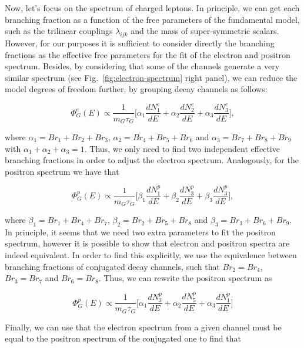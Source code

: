 \documentclass[a4paper,11pt]{article}
\begin{document}
Now, let's focus on the spectrum of charged leptons. In principle, we can get each branching fraction as a function of the free parameters of the fundamental model, such as the trilinear couplings $\lambda_{ijk}$ and the mass of super-symmetric scalars. However, for our purposes it is sufficient to consider directly the branching fractions as the effective free parameters for the fit of the electron and positron spectrum. Besides, by considering that some of the channels generate a very similar spectrum (see Fig.~\ref{fig:electron-spectrum} right panel), we can reduce the model degrees of freedom further, by grouping decay channels as follows:

\begin{equation}
\Phi_{G}^{e}(E) \propto \frac{1}{m_{G}\tau_{G}}\biggl[\alpha_{1}\frac{dN^e_{1}}{dE}+\alpha_{2}\frac{dN^e_{2}}{dE}+\alpha_{3}\frac{dN^e_{3}}{dE}\biggr],
\end{equation}

\noindent where $\alpha_{1}=Br_{1}+Br_{2}+Br_{3}$, $\alpha_{2}=Br_{4}+Br_{5}+Br_{6}$
and $\alpha_{3}=Br_{7}+Br_{8}+Br_{9}$ with $\alpha_{1}+\alpha_{2}+\alpha_{3}=1$. Thus, we only need to find two independent effective branching fractions
in order to adjust the electron spectrum. Analogously, for the positron spectrum we
have that

\begin{equation*}
\Phi_{G}^{p}(E)  \propto  \frac{1}{m_{G}\tau_{G}}\biggl[\beta_1\frac{dN^{p}_{1}}{dE}+
  \beta_2\frac{dN^{p}_3}{dE}+
  \beta_3\frac{dN^{p}_3}{dE}\biggr],
\end{equation*}

\noindent where $\beta_1 =Br_{1}+Br_{4}+Br_{7}$, $\beta_2 = Br_{2}+Br_{5}+Br_{8}$ and $\beta_3 = Br_{3}+Br_{6}+Br_{9}$. In principle, it seems that we need two extra parameters to fit the positron spectrum, however it is possible to show that electron and positron spectra are indeed equivalent. In order to find this explicitly, we use the equivalence between branching fractions of conjugated decay channels, such that $Br_2 = Br_4$, $Br_3 = Br_7$ and $Br_6 = Br_8$. Thus, we can rewrite the positron spectrum as

\begin{equation*}
    \Phi_{G}^{p}(E) \propto  \frac{1}{m_{G}\tau_{G}}\biggl[\alpha_{1}\frac{dN^p_{3}}{dE}+\alpha_{2}\frac{dN^p_{5}}{dE}+\alpha_{3}\frac{dN^p_{1}}{dE}\biggr]
\end{equation*}

Finally, we can use that the electron spectrum from a given channel must be equal to the positron spectrum of the conjugated one to find that
\end{document}

